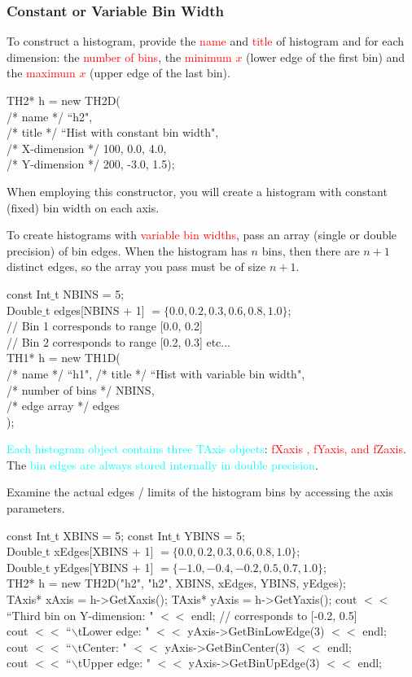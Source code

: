 \documentclass[12pt,a4paper]{article}
\begin{document}
\subsubsection{Constant or Variable Bin Width}
To construct a histogram, provide the \textcolor{red}{name} and \textcolor{red}{title} of histogram and for each dimension: the \textcolor{red}{number of bins}, the \textcolor{red}{minimum $x$} (lower edge of the first bin) and the \textcolor{red}{maximum $x$} (upper edge of the last bin).

TH2* h = new TH2D( \\
/* name */ ``h2", \\
/* title */ ``Hist with constant bin width", \\
/* X-dimension */ 100, 0.0, 4.0, \\
/* Y-dimension */ 200, -3.0, 1.5);

When employing this constructor, you will create a histogram with constant (fixed) bin width on each axis. 

To create histograms with \textcolor{red}{variable bin widths}, pass an array (single or double precision) of bin edges. When the histogram has $n$ bins, then there are $n+1$ distinct edges, so the array you pass must be of size $n+1$.

const Int$\_$t NBINS = 5; \\
Double$\_$t edges[NBINS + 1] $= \{0.0, 0.2, 0.3, 0.6, 0.8, 1.0\}$; \\
// Bin 1 corresponds to range [0.0, 0.2] \\
// Bin 2 corresponds to range [0.2, 0.3] etc... \\
TH1* h = new TH1D( \\
/* name */ ``h1",
/* title */ ``Hist with variable bin width", \\
/* number of bins */ NBINS, \\
/* edge array */ edges \\
);

\textcolor{cyan}{Each histogram object contains three TAxis objects}: \textcolor{red}{fXaxis , fYaxis, and fZaxis}. The \textcolor{cyan}{bin edges are always stored internally in double precision}.

Examine the actual edges / limits of the histogram bins by accessing the axis parameters.

const Int$\_$t XBINS = 5; const Int$\_$t YBINS = 5; \\
Double$\_$t xEdges[XBINS + 1] $= \{0.0, 0.2, 0.3, 0.6, 0.8, 1.0\}$; \\
Double$\_$t yEdges[YBINS + 1] $= \{-1.0, -0.4, -0.2, 0.5, 0.7, 1.0\}$; \\
TH2* h = new TH2D("h2", "h2", XBINS, xEdges, YBINS, yEdges); \\
TAxis* xAxis = h->GetXaxis(); TAxis* yAxis = h->GetYaxis();
cout $<<$ ``Third bin on Y-dimension: " $<<$ endl; // corresponds to [-0.2, 0.5] \\
cout $<<$ ``$\backslash$tLower edge: " $<<$ yAxis->GetBinLowEdge(3) $<<$ endl; \\
cout $<<$ ``$\backslash$tCenter: " $<<$ yAxis->GetBinCenter(3) $<<$ endl; \\
cout $<<$ ``$\backslash$tUpper edge: " $<<$ yAxis->GetBinUpEdge(3) $<<$ endl;
\end{document}

